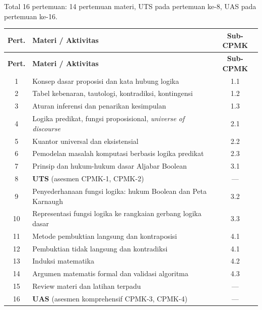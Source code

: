 \documentclass[12pt,a4paper]{article}
\begin{document}
Total 16 pertemuan: 14 pertemuan materi, UTS pada pertemuan ke-8, UAS pada pertemuan ke-16.

\begin{longtable}{|c|>{\raggedright\arraybackslash}p{6.5cm}|c|}
\hline
\textbf{Pert.} & \textbf{Materi / Aktivitas} & \textbf{Sub-CPMK} \\
\hline
\endfirsthead
\hline
\textbf{Pert.} & \textbf{Materi / Aktivitas} & \textbf{Sub-CPMK} \\
\hline
\endhead
\hline
\endfoot

1 & Konsep dasar proposisi dan kata hubung logika & 1.1 \\
\hline
2 & Tabel kebenaran, tautologi, kontradiksi, kontingensi & 1.2 \\
\hline
3 & Aturan inferensi dan penarikan kesimpulan & 1.3 \\
\hline
4 & Logika predikat, fungsi proposisional, \textit{universe of discourse} & 2.1 \\
\hline
5 & Kuantor universal dan eksistensial & 2.2 \\
\hline
6 & Pemodelan masalah komputasi berbasis logika predikat & 2.3 \\
\hline
7 & Prinsip dan hukum-hukum dasar Aljabar Boolean & 3.1 \\
\hline
8 & \textbf{UTS} (asesmen CPMK-1, CPMK-2) & --- \\
\hline
9 & Penyederhanaan fungsi logika: hukum Boolean dan Peta Karnaugh & 3.2 \\
\hline
10 & Representasi fungsi logika ke rangkaian gerbang logika dasar & 3.3 \\
\hline
11 & Metode pembuktian langsung dan kontraposisi & 4.1 \\
\hline
12 & Pembuktian tidak langsung dan kontradiksi & 4.1 \\
\hline
13 & Induksi matematika & 4.2 \\
\hline
14 & Argumen matematis formal dan validasi algoritma & 4.3 \\
\hline
15 & Review materi dan latihan terpadu & --- \\
\hline
16 & \textbf{UAS} (asesmen komprehensif CPMK-3, CPMK-4) & --- \\
\hline
\end{longtable}

\vspace{0.5cm}

\end{document}
